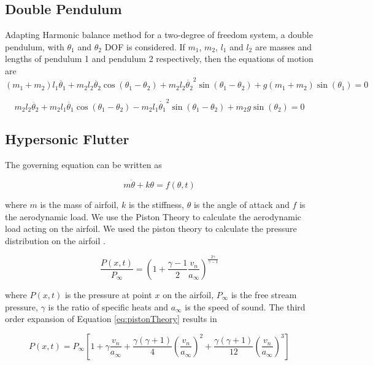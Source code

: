 \documentclass[12pt, a4paper]{extarticle}
\begin{document}
\subsection{Double Pendulum}
Adapting Harmonic balance method for a two-degree of freedom system, a double pendulum, with $\theta_1$ and $\theta_2$ DOF is considered. If $m_1$, $m_2$, $l_1$ and $l_2$ are masses and lengths of pendulum 1 and pendulum 2 respectively, then the equations of motion are
\begin{equation}
(m_1+m_2) l_1 \ddot{\theta_1} + m_2 l_2 \ddot{\theta_2} \cos( \theta_1 - \theta_2 ) + m_2  l_2 \dot{ \theta_2 }^2 \sin( \theta_1 - \theta_2 )+g (m_1+m_2)  \sin( \theta_1) = 0
\end{equation}

\begin{equation}
m_2  l_2 \ddot{\theta_2}+m_2 l_1 \ddot{\theta_1} \cos(\theta_1 - \theta_2)-m_2  l_1 \dot{\theta_1}^2 \sin(\theta_1 - \theta_2)+m_2 g  \sin(\theta_2) = 0
\end{equation}


\subsection{Hypersonic Flutter}
The governing equation can be written as

\begin{equation}\label{eq:GE}
	m\ddot{\theta} + k \theta = f(\theta, t)
\end{equation}

where $m$ is the mass of airfoil, $k$ is the stiffness, $\theta$ is the angle of attack and $f$ is the aerodynamic load. We use the Piston Theory to calculate the aerodynamic load acting on the airfoil. We used the piston theory to calculate the pressure distribution on the airfoil \cite{ashley2012piston}.

\begin{equation}\label{eq:pistonTheory}
	\frac{P(x, t)}{P_\infty} = \left( 1+ \frac{\gamma - 1}{2} \frac{v_n}{a_\infty} \right)^{\frac{2 \gamma}{\gamma - 1}}
\end{equation}

where $P(x, t)$ is the pressure at point $x$ on the airfoil, $P_\infty$ is the free stream pressure, $\gamma$ is the ratio of specific heats and $a_\infty$ is the speed of sound. The third order expansion of Equation \eqref{eq:pistonTheory} results in

\begin{equation}
	P(x,t) = P_\infty
	\left[
	1 +
	\gamma \frac{v_n}{a_\infty} + 
	\frac{\gamma (\gamma + 1)}{4} \left( \frac{v_n}{a_\infty} \right)^2 + 
	\frac{\gamma (\gamma + 1)}{12} \left( \frac{v_n}{a_\infty} \right)^3
	\right]
\end{equation}
\end{document}

